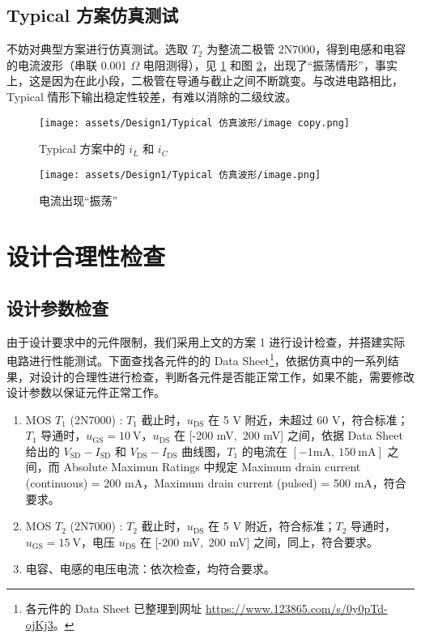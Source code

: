 \documentclass[UTF8]{article}
\theoremstyle{MyLineTheoremStyle} %
\theoremstyle{MyBlockTheoremStyle} %
\theoremstyle{MySubsubsectionStyle} %
\begin{document}
\subsection{Typical 方案仿真测试}
不妨对典型方案进行仿真测试。选取 $T_2$ 为整流二极管 2N7000，得到电感和电容的电流波形（串联 0.001 $\Omega$ 电阻测得），见 \ref{Typical 方案波形 1} 和图 \ref{Typical 方案波形 2}，出现了“振荡情形”，事实上，这是因为在此小段，二极管在导通与截止之间不断跳变。与改进电路相比，Typical 情形下输出稳定性较差，有难以消除的二级纹波。
\begin{figure}[H]\centering
    \texttt{[image: assets/Design1/Typical 仿真波形/image copy.png]}
    \caption{Typical 方案中的 $i_L$ 和 $i_C$}
    \label{Typical 方案波形 1}
\end{figure}
\begin{figure}[H]\centering
    \texttt{[image: assets/Design1/Typical 仿真波形/image.png]}
    \caption{电流出现“振荡”}
    \label{Typical 方案波形 2}
\end{figure}


\section{设计合理性检查}

\subsection{设计参数检查}
由于设计要求中的元件限制，我们采用上文的方案 1 进行设计检查，并搭建实际电路进行性能测试。下面查找各元件的的 Data Sheet\footnote{各元件的 Data Sheet 已整理到网址 \href{https://www.123865.com/s/0y0pTd-ojKj3}{https://www.123865.com/s/0y0pTd-ojKj3}。}，依据仿真中的一系列结果，对设计的合理性进行检查，判断各元件是否能正常工作，如果不能，需要修改设计参数以保证元件正常工作。

\begin{enumerate}
\item MOS $T_1$ (2N7000) : $T_1$ 截止时，$u_{\text{DS}}$ 在 5 V 附近，未超过 60 V，符合标准；$T_1$ 导通时，$u_{\text{GS}} = 10 \ \mathrm{V}$，$u_{\text{DS}}$ 在 [-200 mV,\ 200 mV] 之间，依据 Data Sheet 给出的 $V_{\text{SD}}-I_{\text{SD}}$ 和 $V_{\text{DS}}-I_{\text{DS}}$ 曲线图，$T_1$ 的电流在 $[-1 \mathrm{mA},\ 150\ \mathrm{mA}]$ 之间，而 Absolute Maximun Ratings 中规定 Maximum drain current (continuous) = 200 mA，Maximum drain current (pulsed)  = 500 mA，符合要求。

\item MOS $T_2$ (2N7000) : $T_2$ 截止时，$u_{\text{DS}}$ 在 5 V 附近，符合标准；$T_2$ 导通时，$u_{\text{GS}} = 15 \ \mathrm{V}$，电压 $u_{\text{DS}}$ 在 [-200 mV,\ 200 mV] 之间，同上，符合要求。

\item 电容、电感的电压电流：依次检查，均符合要求。
\end{enumerate}
\end{document}
